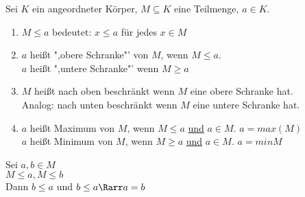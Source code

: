 	Sei $K$ ein angeordneter Körper, $M \subseteq K$ eine Teilmenge, $a \in K$.\\
	\begin{enumerate}
	\item{$M \leq a$ bedeutet: $x \leq a$ für jedes $x \in M$}
	\item{$a$ heißt ",obere Schranke"' von $M$, wenn $M \leq a$.\\
		$a$ heißt ",untere Schranke"' wenn $M \geq a$}
	\item{$M$ heißt nach oben beschränkt wenn $M$ eine obere Schranke hat.\\
	Analog: nach unten beschränkt wenn $M$ eine untere Schranke hat.}
	\item{$a$ heißt Maximum von $M$, wenn $M \leq a$ \underline{und} $a \in M$. $a = max(M)$\\
		$a$ heißt Minimum von $M$, wenn $M \geq a$ \underline{und} $a \in M$. $a = min{M}$}
	\end{enumerate}
\bew
	Sei $a, b \in M$\\
	$M \leq a, M \leq b$\\
	Dann $b \leq a$ und $b \leq a \Rarr a = b$\\
	